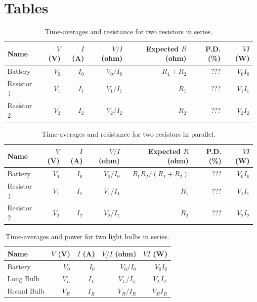 \section{Tables}
\begin{table}[ht]
	\begin{center}
		\begin{tabular}{|l|r|r|r|r|r|r|}
			\hline
			Name & $V$ (V) & $I$ (A) & $V/I$ (ohm) & Expected $R$ (ohm) & P.D. (\%) & $V I$ (W) \\
			\hline
			Battery & $V_{0}$ & $I_{0}$ & $V_{0} / I_{0}$ & $R_{1} + R_{2}$ & ??? & $V_{0} I_{0}$ \\
			Resistor 1 & $V_{1}$ & $I_{1}$ & $V_{1} / I_{1}$ & $R_{1}$ & ??? & $V_{1} I_{1}$ \\
			Resistor 2 & $V_{2}$ & $I_{2}$ & $V_{2} / I_{2}$ & $R_{2}$ & ??? & $V_{2} I_{2}$ \\
			\hline
		\end{tabular}
	\end{center}
	\caption{Time-averages and resistance for two resistors in series.}
	\label{table.03.resistors.series}
\end{table}
\begin{table}[ht]
	\begin{center}
		\begin{tabular}{|l|r|r|r|r|r|r|}
			\hline
			Name & $V$ (V) & $I$ (A) & $V/I$ (ohm) & Expected $R$ (ohm) & P.D. (\%) & $V I$ (W) \\
			\hline
			Battery & $V_{0}$ & $I_{0}$ & $V_{0} / I_{0}$ & $R_{1} R_{2} / (R_{1} + R_{2})$ & ??? & $V_{0} I_{0}$ \\
			Resistor 1 & $V_{1}$ & $I_{1}$ & $V_{1} / I_{1}$ & $R_{1}$ & ??? & $V_{1} I_{1}$ \\
			Resistor 2 & $V_{2}$ & $I_{2}$ & $V_{2} / I_{2}$ & $R_{2}$ & ??? & $V_{2} I_{2}$ \\
			\hline
		\end{tabular}
	\end{center}
	\caption{Time-averages and resistance for two resistors in parallel.}
	\label{table.03.resistors.parallel}
\end{table}
\begin{table}[ht]
	\begin{center}
		\begin{tabular}{|l|r|r|r|r|}
			\hline
			Name & $V$ (V) & $I$ (A) & $V/I$ (ohm) & $V I$ (W) \\
			\hline
			Battery & $V_{0}$ & $I_{0}$ & $V_{0} / I_{0}$ & $V_{0} I_{0}$ \\
			Long Bulb & $V_{L}$ & $I_{L}$ & $V_{L} / I_{L}$ & $V_{L} I_{L}$ \\
			Round Bulb & $V_{R}$ & $I_{R}$ & $V_{R} / I_{R}$ & $V_{R} I_{R}$ \\
			\hline
		\end{tabular}
	\end{center}
	\caption{Time-averages and power for two light bulbs in series.}
	\label{table.03.bulbs.series}
\end{table}
